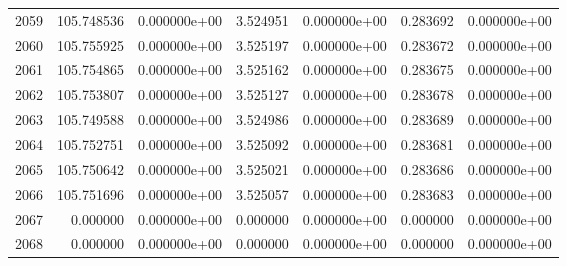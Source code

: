 \begin{tabular}{rrrrrrr}
2059 & 105.748536 &  0.000000e+00 &  3.524951 &  0.000000e+00 &    0.283692 &  0.000000e+00 \\
2060 & 105.755925 &  0.000000e+00 &  3.525197 &  0.000000e+00 &    0.283672 &  0.000000e+00 \\
2061 & 105.754865 &  0.000000e+00 &  3.525162 &  0.000000e+00 &    0.283675 &  0.000000e+00 \\
2062 & 105.753807 &  0.000000e+00 &  3.525127 &  0.000000e+00 &    0.283678 &  0.000000e+00 \\
2063 & 105.749588 &  0.000000e+00 &  3.524986 &  0.000000e+00 &    0.283689 &  0.000000e+00 \\
2064 & 105.752751 &  0.000000e+00 &  3.525092 &  0.000000e+00 &    0.283681 &  0.000000e+00 \\
2065 & 105.750642 &  0.000000e+00 &  3.525021 &  0.000000e+00 &    0.283686 &  0.000000e+00 \\
2066 & 105.751696 &  0.000000e+00 &  3.525057 &  0.000000e+00 &    0.283683 &  0.000000e+00 \\
2067 &   0.000000 &  0.000000e+00 &  0.000000 &  0.000000e+00 &    0.000000 &  0.000000e+00 \\
2068 &   0.000000 &  0.000000e+00 &  0.000000 &  0.000000e+00 &    0.000000 &  0.000000e+00 \\
\bottomrule
\end{tabular}
